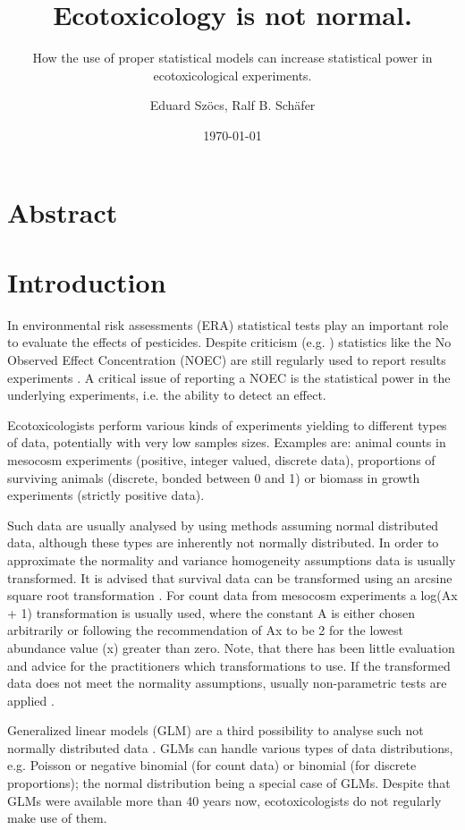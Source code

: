 \documentclass{scrartcl}
\title{Ecotoxicology is not normal.}
\subtitle{How the use of proper statistical models can increase statistical power in ecotoxicological experiments.}
\author{Eduard Szöcs, Ralf B. Schäfer}
\date{\today}
\begin{document}
\maketitle

\section*{Abstract}


\section{Introduction}
In environmental risk assessments (ERA) statistical tests play an important role to evaluate the effects of pesticides. 
Despite criticism (e.g. \citet{landis_well_2011}) statistics like the No Observed Effect Concentration (NOEC) are still regularly used to report results experiments \citep{jager_bad_2012}. 
A critical issue of reporting a NOEC is the statistical power in the underlying experiments, i.e. the ability to detect an effect.

Ecotoxicologists perform various kinds of experiments yielding to different types of data, potentially with very low samples sizes. 
Examples are: animal counts in mesocosm experiments (positive, integer valued, discrete data), proportions of surviving animals (discrete, bonded between 0 and 1) or biomass in growth experiments (strictly positive data).

Such data are usually analysed by using methods assuming normal distributed data, although these types are inherently not normally distributed. 
In order to approximate the normality and variance homogeneity assumptions data is usually transformed.
It is advised that survival data can be transformed using an arcsine square root transformation \citep{oecd_current_2006, newman_quantitative_2012}. 
For count data from mesocosm experiments a log(Ax + 1) transformation is usually used, where the constant A is either chosen arbitrarily or following the recommendation of \citet{van_den_brink_impact_2000} Ax to be 2 for the lowest abundance value (x) greater than zero. 
Note, that there has been little evaluation and advice for the practitioners which transformations to use.
If the transformed data does not meet the normality assumptions, usually non-parametric tests are applied \citep{wang_making_2011}.

Generalized linear models (GLM) are a third possibility to analyse such not normally distributed data \citep{nelder_generalized_1972}.
GLMs can handle various types of data distributions, e.g. Poisson or negative binomial (for count data) or binomial (for discrete proportions); the normal distribution being a special case of GLMs.
Despite that GLMs were available more than 40 years now, ecotoxicologists do not regularly make use of them.
\end{document}
